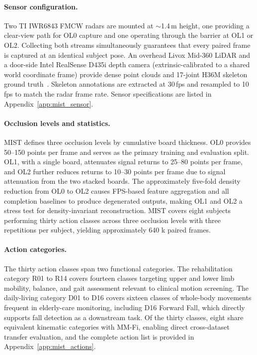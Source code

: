 \documentclass{article}
\begin{document}
\paragraph{Sensor configuration.}
Two TI IWR6843 FMCW radars are mounted at $\sim$1.4\,m height,
one providing a clear-view path for OL0 capture and one operating through
the barrier at OL1 or OL2. Collecting both streams simultaneously
guarantees that every paired frame is captured at an identical subject pose.
An overhead Livox Mid-360 LiDAR and a door-side Intel RealSense D435i
depth camera (extrinsic-calibrated to a shared world coordinate frame) provide dense point clouds and 17-joint H36M skeleton ground truth~\cite{ionescu2013human3}.
Skeleton annotations are extracted at 30\,fps and resampled to 10\,fps
to match the radar frame rate.
Sensor specifications are listed in Appendix~\ref{app:mist_sensor}.

\paragraph{Occlusion levels and statistics.}
MIST defines three occlusion levels by cumulative board thickness.
OL0 provides 50--150 points per frame and serves as the primary training and evaluation split.
OL1, with a single board, attenuates signal returns to 25--80 points per frame,
and OL2 further reduces returns
to 10--30 points per frame due to signal attenuation from the two stacked boards.
The approximately five-fold density reduction from OL0 to OL2 causes FPS-based feature aggregation and all completion baselines to produce
degenerated outputs, making OL1 and OL2 a stress test for
density-invariant reconstruction. MIST covers eight subjects performing thirty action classes across three occlusion
levels with three repetitions per subject, yielding approximately 640 k
paired frames.

\paragraph{Action categories.}
The thirty action classes span two functional categories.
The rehabilitation category R01 to R14 covers fourteen classes targeting
upper and lower limb mobility, balance, and gait assessment relevant
to clinical motion screening.
The daily-living category D01 to D16 covers sixteen classes of whole-body
movements frequent in elderly-care monitoring, including D16 Forward
Fall, which directly supports fall detection as a downstream task.
Of the thirty classes, eight share equivalent kinematic categories with MM-Fi,
enabling direct cross-dataset transfer evaluation, and the complete action
list is provided in Appendix~\ref{app:mist_actions}.
\end{document}

